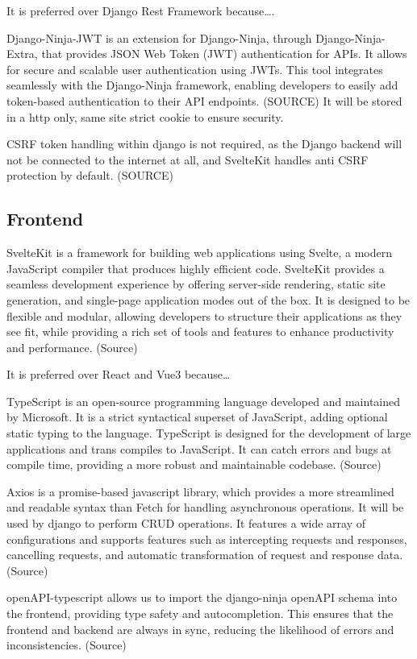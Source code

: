 \begin{multicols}{2}
It is preferred over Django Rest Framework because….

Django-Ninja-JWT is an extension for Django-Ninja, through Django-Ninja-Extra, that provides JSON Web Token (JWT) authentication for APIs. It allows for secure and scalable user authentication using JWTs. This tool integrates seamlessly with the Django-Ninja framework, enabling developers to easily add token-based authentication to their API endpoints. (SOURCE) It will be stored in a http only, same site strict cookie to ensure security. 

CSRF token handling within django is not required, as the Django backend will not be connected to the internet at all, and SvelteKit handles anti CSRF protection by default. (SOURCE)

\subsection{Frontend}
SvelteKit is a framework for building web applications using Svelte, a modern JavaScript compiler that produces highly efficient code. SvelteKit provides a seamless development experience by offering server-side rendering, static site generation, and single-page application modes out of the box. It is designed to be flexible and modular, allowing developers to structure their applications as they see fit, while providing a rich set of tools and features to enhance productivity and performance. (Source)

It is preferred over React and Vue3 because…

TypeScript is an open-source programming language developed and maintained by Microsoft. It is a strict syntactical superset of JavaScript, adding optional static typing to the language. TypeScript is designed for the development of large applications and trans compiles to JavaScript. It can catch errors and bugs at compile time, providing a more robust and maintainable codebase. (Source)


Axios is a promise-based javascript library, which provides a more streamlined and readable syntax than Fetch for handling asynchronous operations. It will be used by django to perform CRUD operations. It features a wide array of configurations and supports features such as intercepting requests and responses, cancelling requests, and automatic transformation of request and response data. (Source)

openAPI-typescript allows us to import the django-ninja openAPI schema into the frontend, providing type safety and autocompletion. This ensures that the frontend and backend are always in sync, reducing the likelihood of errors and inconsistencies. (Source)


\end{multicols}
